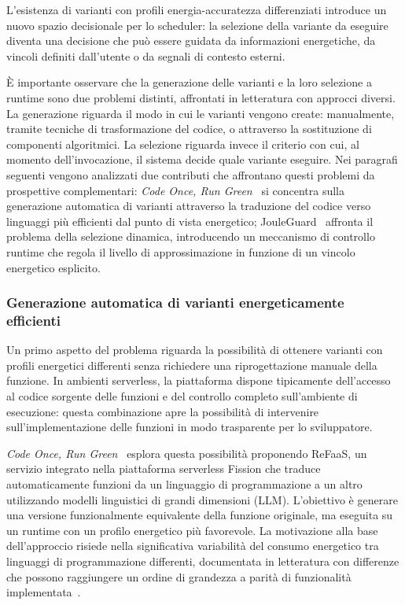 L'esistenza di varianti con profili energia-accuratezza differenziati
introduce un nuovo spazio decisionale per lo scheduler: la selezione
della variante da eseguire diventa una decisione che può essere guidata
da informazioni energetiche, da vincoli definiti dall'utente o da
segnali di contesto esterni.

È importante osservare che la generazione delle varianti e la loro
selezione a runtime sono due problemi distinti, affrontati in letteratura
con approcci diversi. La generazione riguarda il modo in cui le varianti
vengono create: manualmente, tramite tecniche di trasformazione del
codice, o attraverso la sostituzione di componenti algoritmici. La
selezione riguarda invece il criterio con cui, al momento
dell'invocazione, il sistema decide quale variante eseguire. Nei
paragrafi seguenti vengono analizzati due contributi che affrontano
questi problemi da prospettive complementari: \emph{Code Once, Run
Green}~\cite{refaas} si concentra sulla generazione automatica di
varianti attraverso la traduzione del codice verso linguaggi più
efficienti dal punto di vista energetico; JouleGuard~\cite{jouleguard}
affronta il problema della selezione dinamica, introducendo un
meccanismo di controllo runtime che regola il livello di
approssimazione in funzione di un vincolo energetico esplicito.

\subsubsection{Generazione automatica di varianti energeticamente efficienti}
\label{subsubsec:code_once_run_green}

Un primo aspetto del problema riguarda la possibilità di ottenere
varianti con profili energetici differenti senza richiedere una
riprogettazione manuale della funzione. In ambienti serverless, la
piattaforma dispone tipicamente dell'accesso al codice sorgente delle
funzioni e del controllo completo sull'ambiente di esecuzione: questa
combinazione apre la possibilità di intervenire sull'implementazione
delle funzioni in modo trasparente per lo sviluppatore.

\emph{Code Once, Run Green}~\cite{refaas} esplora questa possibilità
proponendo ReFaaS, un servizio integrato nella piattaforma serverless
Fission che traduce automaticamente funzioni da un linguaggio di
programmazione a un altro utilizzando modelli linguistici di grandi
dimensioni (LLM). L'obiettivo è generare una versione funzionalmente
equivalente della funzione originale, ma eseguita su un runtime con un
profilo energetico più favorevole. La motivazione alla base
dell'approccio risiede nella significativa variabilità del consumo
energetico tra linguaggi di programmazione differenti, documentata in
letteratura con differenze che possono raggiungere un ordine di
grandezza a parità di funzionalità implementata~\cite{refaas}.

